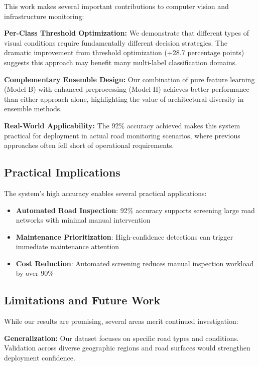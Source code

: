 \documentclass[12pt]{article}
\begin{document}
This work makes several important contributions to computer vision and infrastructure monitoring:

\textbf{Per-Class Threshold Optimization:} We demonstrate that different types of visual conditions require fundamentally different decision strategies. The dramatic improvement from threshold optimization (+28.7 percentage points) suggests this approach may benefit many multi-label classification domains.

\textbf{Complementary Ensemble Design:} Our combination of pure feature learning (Model B) with enhanced preprocessing (Model H) achieves better performance than either approach alone, highlighting the value of architectural diversity in ensemble methods.

\textbf{Real-World Applicability:} The 92\% accuracy achieved makes this system practical for deployment in actual road monitoring scenarios, where previous approaches often fell short of operational requirements.

\subsection{Practical Implications}

The system's high accuracy enables several practical applications:

\begin{itemize}[itemsep=1pt,parsep=0pt,topsep=3pt]
\item \textbf{Automated Road Inspection}: 92\% accuracy supports screening large road networks with minimal manual intervention
\item \textbf{Maintenance Prioritization}: High-confidence detections can trigger immediate maintenance attention
\item \textbf{Cost Reduction}: Automated screening reduces manual inspection workload by over 90\%
\end{itemize}

\subsection{Limitations and Future Work}

While our results are promising, several areas merit continued investigation:

\textbf{Generalization:} Our dataset focuses on specific road types and conditions. Validation across diverse geographic regions and road surfaces would strengthen deployment confidence.
\end{document}
